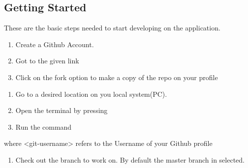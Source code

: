 \documentclass[letterpaper,10pt,english]{sphinxmanual}
\begin{document}
\subsection{Getting Started}
\label{\detokenize{developer:getting-started}}
These are the basic steps needed to start developing on the application.
\begin{enumerate}
%
\item {} 
Create a Github Account.

\item {} \begin{description}
\item[{Got to the given link}] \leavevmode
{}

\end{description}

\item {} 
Click on the fork option to make a copy of the repo on your profile

\end{enumerate}

\begin{enumerate}
%
\setcounter{enumi}{3}
\item {} 
Go to a desired location on you local system(PC).

\item {} 
Open the terminal by pressing 

\item {} 
Run the command

\end{enumerate}

\begin{sphinxVerbatim}[commandchars=\\\{\}]
  
\end{sphinxVerbatim}

where \textless{}git-username\textgreater{} refers to the Username of your Github profile
\begin{enumerate}
%
\setcounter{enumi}{6}
\item {} 
Check out the branch to work on. By default the master branch in selected.

\end{enumerate}
\end{document}
